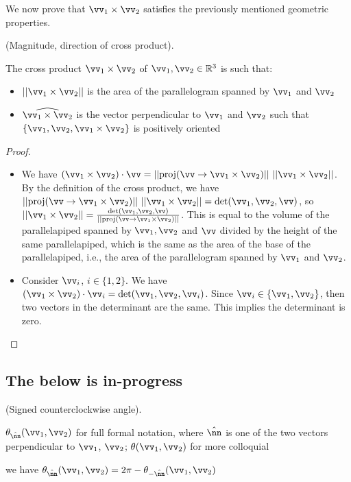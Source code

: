 We now prove that $\vv_1 \times \vv_2$ satisfies the previously mentioned geometric properties.

\begin{theorem}
    (Magnitude, direction of cross product).
    
    The cross product $\vv_1 \times \vv_2$ of  $\vv_1, \vv_2 \in \R^3$ is such that:
    
    \begin{itemize}
        \item $||\vv_1 \times \vv_2||$ is the area of the parallelogram spanned by $\vv_1$ and $\vv_2$
        \item $\widehat{\vv_1 \times \vv_2}$ is the vector perpendicular to $\vv_1$ and $\vv_2$ such that $\{\vv_1, \vv_2, \vv_1 \times \vv_2\}$ is positively oriented
    \end{itemize}
\end{theorem}

\begin{proof}
    \hspace{0mm} \\
    \begin{itemize}
        \item We have $(\vv_1 \times \vv_2) \cdot \vv = ||\proj(\vv \rightarrow \vv_1 \times \vv_2)|| \spc ||\vv_1 \times \vv_2||$. By the definition of the cross product, we have $||\proj(\vv \rightarrow \vv_1 \times \vv_2)|| \spc ||\vv_1 \times \vv_2|| = \det(\vv_1, \vv_2, \vv)$, so $||\vv_1 \times \vv_2|| = \frac{\det(\vv_1, \vv_2, \vv)}{||\proj(\vv \rightarrow \vv_1 \times \vv_2)||}$. This is equal to the volume of the parallelapiped spanned by $\vv_1, \vv_2$ and $\vv$ divided by the height of the same parallelapiped, which is the same as the area of the base of the parallelapiped, i.e., the area of the parallelogram spanned by $\vv_1$ and $\vv_2$.
        \item Consider $\vv_i$, $i \in \{1, 2\}$. We have $(\vv_1 \times \vv_2) \cdot \vv_i = \det(\vv_1, \vv_2, \vv_i)$. Since $\vv_i \in \{\vv_1, \vv_2\}$, then two vectors in the determinant are the same. This implies the determinant is zero.
    \end{itemize}
\end{proof}

\subsection*{The below is in-progress}

\begin{defn}
    (Signed counterclockwise angle).
    
    $\theta_{\hat{\nn}}(\vv_1, \vv_2)$ for full formal notation, where $\hat{\nn}$ is one of the two vectors perpendicular to $\vv_1$, $\vv_2$; $\theta(\vv_1, \vv_2)$ for more colloquial
    
    we have $\theta_{\hat{\nn}}(\vv_1, \vv_2) = 2\pi - \theta_{-\hat{\nn}}(\vv_1, \vv_2)$
\end{defn}

